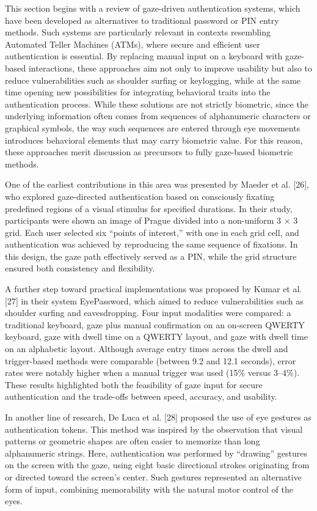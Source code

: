 \documentclass[12pt]{report}
\begin{document}
This section begins with a review of gaze-driven authentication systems, which have been developed as alternatives to traditional password or PIN entry methods.
Such systems are particularly relevant in contexts resembling Automated Teller Machines (ATMs), where secure and efficient user authentication is essential. 
By replacing manual input on a keyboard with gaze-based interactions, these approaches aim not only to improve usability but also to reduce vulnerabilities such as shoulder surfing or keylogging, while at the same time opening new possibilities for integrating behavioral traits into the authentication process.
While these solutions are not strictly biometric, since the underlying information often comes from sequences of alphanumeric characters or graphical symbols, the way such sequences are entered through eye movements introduces behavioral elements that may carry biometric value.
For this reason, these approaches merit discussion as precursors to fully gaze-based biometric methods.

One of the earliest contributions in this area was presented by Maeder et al. [26], who explored gaze-directed authentication based on consciously fixating predefined regions of a visual stimulus for specified durations.
In their study, participants were shown an image of Prague divided into a non-uniform 3 × 3 grid.
Each user selected six “points of interest,” with one in each grid cell, and authentication was achieved by reproducing the same sequence of fixations.
In this design, the gaze path effectively served as a PIN, while the grid structure ensured both consistency and flexibility.

A further step toward practical implementations was proposed by Kumar et al. [27] in their system EyePassword, which aimed to reduce vulnerabilities such as shoulder surfing and eavesdropping. 
Four input modalities were compared: a traditional keyboard, gaze plus manual confirmation on an on-screen QWERTY keyboard, gaze with dwell time on a QWERTY layout, and gaze with dwell time on an alphabetic layout.
Although average entry times across the dwell and trigger-based methods were comparable (between 9.2 and 12.1 seconds), error rates were notably higher when a manual trigger was used (15\% versus 3–4\%).
These results highlighted both the feasibility of gaze input for secure authentication and the trade-offs between speed, accuracy, and usability.

In another line of research, De Luca et al. [28] proposed the use of eye gestures as authentication tokens. 
This method was inspired by the observation that visual patterns or geometric shapes are often easier to memorize than long alphanumeric strings. 
Here, authentication was performed by “drawing” gestures on the screen with the gaze, using eight basic directional strokes originating from or directed toward the screen's center. 
Such gestures represented an alternative form of input, combining memorability with the natural motor control of the eyes.
\end{document}
